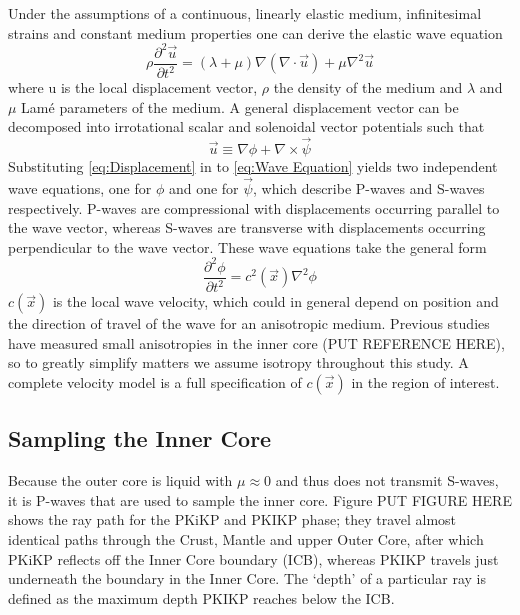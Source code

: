 \documentclass[11pt,a4paper]{article}
\begin{document}
Under the assumptions of a continuous, linearly elastic medium, infinitesimal strains and constant medium properties one can derive the elastic wave equation
\begin{equation}
	\rho \frac{\partial^{2} \vec{u}}{\partial t^{2}} = \left ( \lambda + \mu \right ) \nabla \left ( \nabla \cdot \vec{u} \right ) + \mu \nabla^{2} \vec{u}
	\label{eq:Wave Equation}
\end{equation}
where u is the local displacement vector, $\rho$ the density of the medium and $\lambda$ and $\mu$  Lam\'{e} parameters of the medium. A general displacement vector can be decomposed into irrotational scalar and solenoidal vector potentials such that
\begin{equation}
	\vec{u} \equiv \nabla \phi + \nabla \times \vec{\psi}
	\label{eq:Displacement}
\end{equation}
Substituting \eqref{eq:Displacement} in to \eqref{eq:Wave Equation} yields two independent wave equations, one for $\phi$ and one for $\vec{\psi}$, which describe P-waves and S-waves respectively. P-waves are compressional with displacements occurring parallel to the wave vector, whereas S-waves are transverse with displacements occurring perpendicular to the wave vector. These wave equations take the general form
\begin{equation}
	\frac{\partial^{2} \phi}{\partial t^{2}} = c^{2} \left ( \vec{x} \right ) \nabla^{2} \phi
\end{equation}
$c(\vec{x})$ is the local wave velocity, which could in general depend on position and the direction of travel of the wave for an anisotropic medium. Previous studies have measured small anisotropies in the inner core (PUT REFERENCE HERE), so to greatly simplify matters we assume isotropy throughout this study. A complete velocity model is a full specification of $c(\vec{x})$ in the region of interest.

\subsection{Sampling the Inner Core}
\label{sec:Sampling}
Because the outer core is liquid with $\mu \approx 0$ and thus does not transmit S-waves, it is P-waves that are used to sample the inner core. Figure PUT FIGURE HERE shows the ray path for the PKiKP and PKIKP phase; they travel almost identical paths through the Crust, Mantle and upper Outer Core, after which PKiKP reflects off the Inner Core boundary (ICB), whereas PKIKP travels just underneath the boundary in the Inner Core. The `depth' of a particular ray is defined as the maximum depth PKIKP reaches below the ICB.
\end{document}
